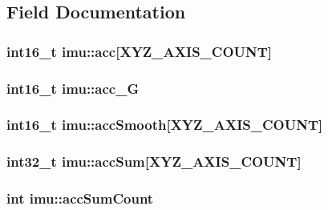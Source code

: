 \subsection{Field Documentation}
\hypertarget{structimu_a43f0ccec5140b596150315621bf6a20b}{
\subsubsection[{acc}]{\setlength{\rightskip}{0pt plus 5cm}int16\+\_\+t imu\+::acc\mbox{[}{\bf X\+Y\+Z\+\_\+\+A\+X\+I\+S\+\_\+\+C\+O\+U\+N\+T}\mbox{]}}}\label{structimu_a43f0ccec5140b596150315621bf6a20b}
\hypertarget{structimu_aadf5a464c71935c0d35904bf8151f1f3}{
\subsubsection[{acc\+\_\+1\+G}]{\setlength{\rightskip}{0pt plus 5cm}int16\+\_\+t imu\+::acc\+\_\+G}}\label{structimu_aadf5a464c71935c0d35904bf8151f1f3}
\hypertarget{structimu_a92c9d735afcc7d08049adaee8cebc4e1}{
\subsubsection[{acc\+Smooth}]{\setlength{\rightskip}{0pt plus 5cm}int16\+\_\+t imu\+::acc\+Smooth\mbox{[}{\bf X\+Y\+Z\+\_\+\+A\+X\+I\+S\+\_\+\+C\+O\+U\+N\+T}\mbox{]}}}\label{structimu_a92c9d735afcc7d08049adaee8cebc4e1}
\hypertarget{structimu_adefe15545fa149bf5a3a5e3163fcd645}{
\subsubsection[{acc\+Sum}]{\setlength{\rightskip}{0pt plus 5cm}int32\+\_\+t imu\+::acc\+Sum\mbox{[}{\bf X\+Y\+Z\+\_\+\+A\+X\+I\+S\+\_\+\+C\+O\+U\+N\+T}\mbox{]}}}\label{structimu_adefe15545fa149bf5a3a5e3163fcd645}
\hypertarget{structimu_a51ba67db8678eec1b0cb38196f53a561}{
\subsubsection[{acc\+Sum\+Count}]{\setlength{\rightskip}{0pt plus 5cm}int imu\+::acc\+Sum\+Count}}\label{structimu_a51ba67db8678eec1b0cb38196f53a561}

